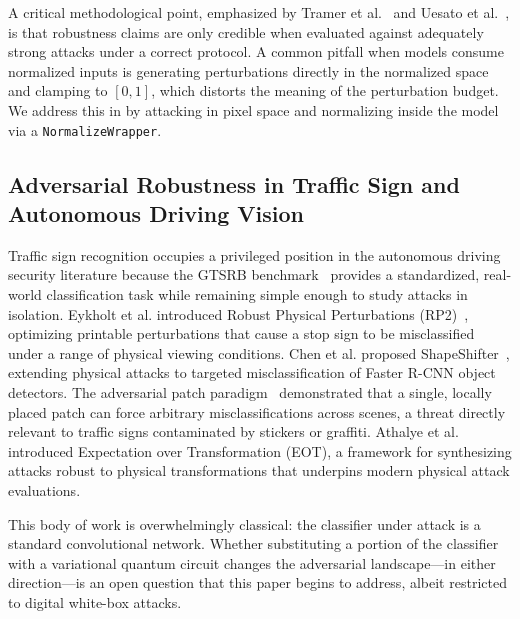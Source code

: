 \documentclass[11pt]{article}
\begin{document}
A critical methodological point, emphasized by Tramer et
al.~\cite{tramer2020adaptive} and Uesato et al.~\cite{uesato2018adversarial},
is that robustness claims are only credible when evaluated against
adequately strong attacks under a correct protocol. A common pitfall when
models consume normalized inputs is generating perturbations directly in the
normalized space and clamping to $[0,1]$, which distorts the meaning of the
perturbation budget. We address this in  by
attacking in pixel space and normalizing inside the model via a
\texttt{NormalizeWrapper}.

\subsection{Adversarial Robustness in Traffic Sign and Autonomous Driving Vision}
\label{sec:related:traffic}

Traffic sign recognition occupies a privileged position in the autonomous
driving security literature because the GTSRB benchmark~\cite{stallkamp2012gtsrb}
provides a standardized, real-world classification task while remaining
simple enough to study attacks in isolation. Eykholt et al. introduced
Robust Physical Perturbations (RP2)~\cite{eykholt2018rp2}, optimizing
printable perturbations that cause a stop sign to be misclassified under a
range of physical viewing conditions. Chen et al. proposed
ShapeShifter~\cite{chen2018shapeshifter}, extending physical attacks to
targeted misclassification of Faster R-CNN object detectors. The
adversarial patch paradigm~\cite{brown2017adversarialpatch} demonstrated
that a single, locally placed patch can force arbitrary misclassifications
across scenes, a threat directly relevant to traffic signs contaminated by
stickers or graffiti. Athalye et al.~\cite{athalye2018eot} introduced
Expectation over Transformation (EOT), a framework for synthesizing
attacks robust to physical transformations that underpins modern physical
attack evaluations.

This body of work is overwhelmingly classical: the classifier under attack
is a standard convolutional network. Whether substituting a portion of the
classifier with a variational quantum circuit changes the adversarial
landscape---in either direction---is an open question that this paper
begins to address, albeit restricted to digital white-box attacks.

\end{document}
